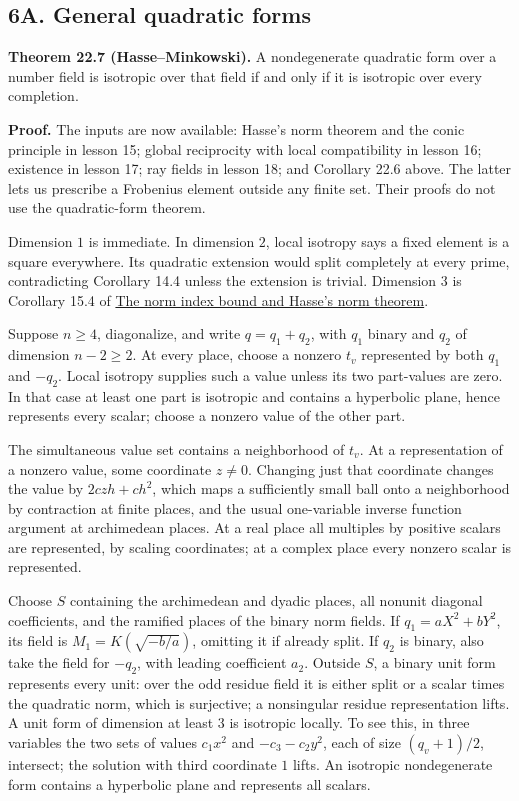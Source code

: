 \documentclass[11pt,a4paper]{article}
\begin{document}
\subsection{6A. General quadratic
forms}\label{a.-general-quadratic-forms}

\textbf{Theorem 22.7 (Hasse--Minkowski).} A nondegenerate quadratic form
over a number field is isotropic over that field if and only if it is
isotropic over every completion.

\textbf{Proof.} The inputs are now available: Hasse's norm theorem and
the conic principle in lesson 15; global reciprocity with local
compatibility in lesson 16; existence in lesson 17; ray fields in lesson
18; and Corollary 22.6 above. The latter lets us prescribe a Frobenius
element outside any finite set. Their proofs do not use the
quadratic-form theorem.

Dimension \(1\) is immediate. In dimension \(2\), local isotropy says a
fixed element is a square everywhere. Its quadratic extension would
split completely at every prime, contradicting Corollary 14.4 unless the
extension is trivial. Dimension \(3\) is Corollary 15.4 of
\href{../the-norm-index-bound-and-hasses-norm-theorem.html}{The norm
index bound and Hasse's norm theorem}.

Suppose \(n\geq4\), diagonalize, and write \(q=q_1+q_2\), with \(q_1\)
binary and \(q_2\) of dimension \(n-2\geq2\). At every place, choose a
nonzero \(t_v\) represented by both \(q_1\) and \(-q_2\). Local isotropy
supplies such a value unless its two part-values are zero. In that case
at least one part is isotropic and contains a hyperbolic plane, hence
represents every scalar; choose a nonzero value of the other part.

The simultaneous value set contains a neighborhood of \(t_v\). At a
representation of a nonzero value, some coordinate \(z\ne0\). Changing
just that coordinate changes the value by \(2czh+ch^2\), which maps a
sufficiently small ball onto a neighborhood by contraction at finite
places, and the usual one-variable inverse function argument at
archimedean places. At a real place all multiples by positive scalars
are represented, by scaling coordinates; at a complex place every
nonzero scalar is represented.

Choose \(S\) containing the archimedean and dyadic places, all nonunit
diagonal coefficients, and the ramified places of the binary norm
fields. If \(q_1=aX^2+bY^2\), its field is \(M_1=K(\sqrt{-b/a})\),
omitting it if already split. If \(q_2\) is binary, also take the field
for \(-q_2\), with leading coefficient \(a_2\). Outside \(S\), a binary
unit form represents every unit: over the odd residue field it is either
split or a scalar times the quadratic norm, which is surjective; a
nonsingular residue representation lifts. A unit form of dimension at
least \(3\) is isotropic locally. To see this, in three variables the
two sets of values \(c_1x^2\) and \(-c_3-c_2y^2\), each of size
\((q_v+1)/2\), intersect; the solution with third coordinate \(1\)
lifts. An isotropic nondegenerate form contains a hyperbolic plane and
represents all scalars.
\end{document}
